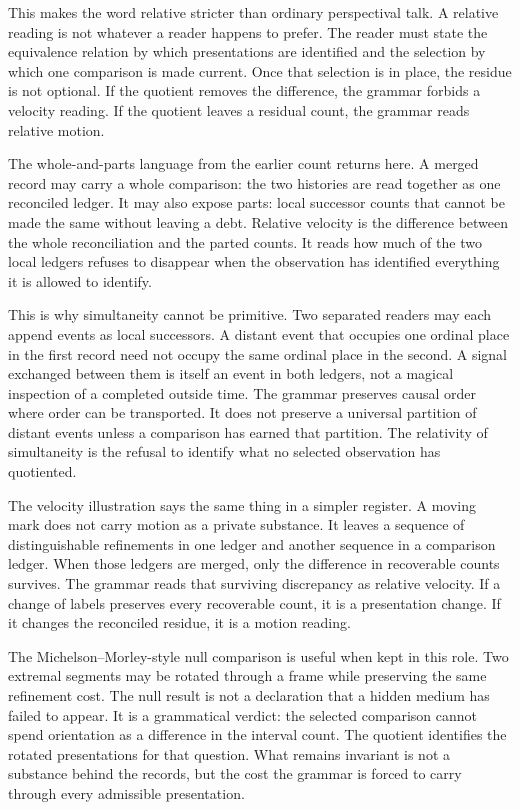 This makes the word relative stricter than ordinary perspectival talk. A
relative reading is not whatever a reader happens to prefer. The reader must
state the equivalence relation by which presentations are identified and the
selection by which one comparison is made current. Once that selection is in
place, the residue is not optional. If the quotient removes the difference,
the grammar forbids a velocity reading. If the quotient leaves a residual
count, the grammar reads relative motion.

The whole-and-parts language from the earlier count returns here. A merged
record may carry a whole comparison: the two histories are read together as
one reconciled ledger. It may also expose parts: local successor counts that
cannot be made the same without leaving a debt. Relative velocity is the
difference between the whole reconciliation and the parted counts. It reads
how much of the two local ledgers refuses to disappear when the observation
has identified everything it is allowed to identify.

This is why simultaneity cannot be primitive. Two separated readers may each
append events as local successors. A distant event that occupies one ordinal
place in the first record need not occupy the same ordinal place in the
second. A signal exchanged between them is itself an event in both ledgers,
not a magical inspection of a completed outside time. The grammar preserves
causal order where order can be transported. It does not preserve a universal
partition of distant events unless a comparison has earned that partition.
The relativity of simultaneity is the refusal to identify what no selected
observation has quotiented.

The velocity illustration says the same thing in a simpler register. A
moving mark does not carry motion as a private substance. It leaves a
sequence of distinguishable refinements in one ledger and another sequence
in a comparison ledger. When those ledgers are merged, only the difference in
recoverable counts survives. The grammar reads that surviving discrepancy as
relative velocity. If a change of labels preserves every recoverable count,
it is a presentation change. If it changes the reconciled residue, it is a
motion reading.

The Michelson--Morley-style null comparison is useful when kept in this
role. Two extremal segments may be rotated through a frame while preserving
the same refinement cost. The null result is not a declaration that a hidden
medium has failed to appear. It is a grammatical verdict: the selected
comparison cannot spend orientation as a difference in the interval count.
The quotient identifies the rotated presentations for that question. What
remains invariant is not a substance behind the records, but the cost the
grammar is forced to carry through every admissible presentation.

